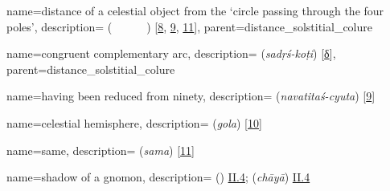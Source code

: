 {
        name={distance of a celestial object from the `circle passing through the four poles'},
        description={\newline{} (\textit{\bud\idafaconsonant\ \kawkab\ \az\ \guillemotleft\dayiri\idafavowel\ \marri\ \biaqtab\idafaconsonant\ \arbai\guillemotright}) [\hyperlink{PEpass8}{8}, \hyperlink{PEpass9}{9}, \hyperlink{PEpass11}{11}]},
        parent={distance_solstitial_colure}
}

{
        name={congruent complementary arc},
        description={ (\textit{sadṛś-koṭi}) [\hyperlink{SEpassD}{δ}]},
        parent={distance_solstitial_colure}
}





{       
        name={having been reduced from ninety},
        description={ (\textit{navatitaś-cyuta}) [\hyperlink{SEpass9}{9}]}
}

{
        name={celestial hemisphere},
        description={ (\textit{gola}) [\hyperlink{SEpass10}{10}]}
}

{
        name={same},
        description={ (\textit{sama}) [\hyperlink{SEpass11}{11}]}
}


{
        name={shadow of a gnomon},
        description={ (\zill) \hyperlink{Pii4}{II.4};   (\textit{chāyā}) \hyperlink{Sii4}{II.4}}
}

